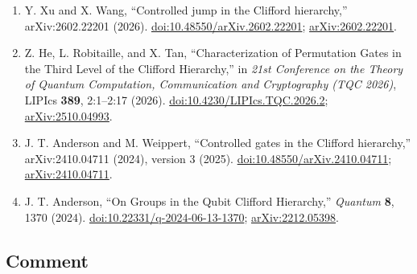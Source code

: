 \begin{enumerate}[label={},leftmargin=4.8em,labelsep=0.5em]
  \footnotesize
  \item[\textup{[XW26]}]\label{ref:422d-xu-wang}
  Y. Xu and X. Wang, ``Controlled jump in the Clifford hierarchy,''
  arXiv:2602.22201 (2026).
  \href{https://doi.org/10.48550/arXiv.2602.22201}{doi:10.48550/arXiv.2602.22201};
  \href{https://arxiv.org/abs/2602.22201}{arXiv:2602.22201}.

  \item[\textup{[HRT26]}]\label{ref:422d-he-robitaille-tan}
  Z. He, L. Robitaille, and X. Tan, ``Characterization of Permutation Gates
  in the Third Level of the Clifford Hierarchy,'' in \emph{21st Conference on
  the Theory of Quantum Computation, Communication and Cryptography (TQC
  2026)}, LIPIcs \textbf{389}, 2:1--2:17 (2026).
  \href{https://doi.org/10.4230/LIPIcs.TQC.2026.2}{doi:10.4230/LIPIcs.TQC.2026.2};
  \href{https://arxiv.org/abs/2510.04993}{arXiv:2510.04993}.

  \item[\textup{[AW24]}]\label{ref:422d-anderson-weippert}
  J. T. Anderson and M. Weippert, ``Controlled gates in the Clifford
  hierarchy,'' arXiv:2410.04711 (2024), version 3 (2025).
  \href{https://doi.org/10.48550/arXiv.2410.04711}{doi:10.48550/arXiv.2410.04711};
  \href{https://arxiv.org/abs/2410.04711}{arXiv:2410.04711}.

  \item[\textup{[And24]}]\label{ref:422d-anderson}
  J. T. Anderson, ``On Groups in the Qubit Clifford Hierarchy,''
  \emph{Quantum} \textbf{8}, 1370 (2024).
  \href{https://doi.org/10.22331/q-2024-06-13-1370}{doi:10.22331/q-2024-06-13-1370};
  \href{https://arxiv.org/abs/2212.05398}{arXiv:2212.05398}.
\end{enumerate}

\subsection*{Comment}

